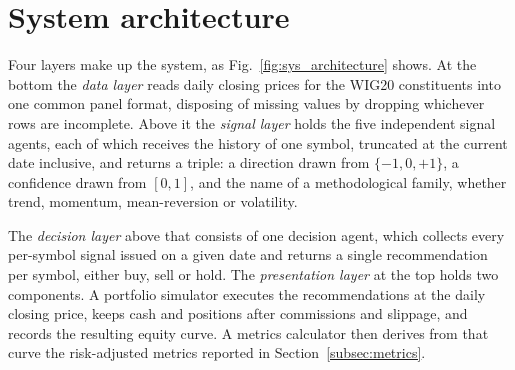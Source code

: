 \section{System architecture}\label{sec:system}

Four layers make up the system, as Fig.~\ref{fig:sys_architecture} shows. At the bottom the \emph{data layer} reads daily closing prices for the WIG20 constituents into one common panel format, disposing of missing values by dropping whichever rows are incomplete. Above it the \emph{signal layer} holds the five independent signal agents, each of which receives the history of one symbol, truncated at the current date inclusive, and returns a triple: a direction drawn from $\{-1, 0, +1\}$, a confidence drawn from $[0, 1]$, and the name of a methodological family, whether trend, momentum, mean-reversion or volatility.

The \emph{decision layer} above that consists of one decision agent, which collects every per-symbol signal issued on a given date and returns a single recommendation per symbol, either buy, sell or hold. The \emph{presentation layer} at the top holds two components. A portfolio simulator executes the recommendations at the daily closing price, keeps cash and positions after commissions and slippage, and records the resulting equity curve. A metrics calculator then derives from that curve the risk-adjusted metrics reported in Section~\ref{subsec:metrics}.

